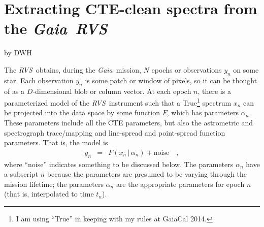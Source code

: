 \documentclass[11pt]{article}
\newcommand{\given}{\,|\,}
\newcommand{\instrument}[1]{\textsl{#1}}
\newcommand{\Gaia}{\instrument{Gaia}}
\newcommand{\RVS}{\instrument{RVS}}
\begin{document}
\section*{Extracting CTE-clean spectra from the \Gaia\ \RVS}
\noindent
by DWH

\begin{abstract}

The \Gaia~\RVS\ data will suffer from observable distortions (CTE)
caused by radiation damage and the charge traps that are caused
thereby.
The \RVS\ team is creating empirical models of the time-dependent
distortions.
These models are computationally feasible to ``run forward''; indeed
parameter estimation (radial velocities, temperatures, and so on)
based on the \RVS\ will be based on a forward model of the data,
including the CTE.
Here we show that it is possible to extract CTE-undistorted spectra
from either single epochs or else multiple epochs of \RVS\ data using
one of these CTE models.
There is no need to ``undistort'' or ``correct'' the data.
Inasmuch as these extracted spectra and their uncertainty tensors will
be close to sufficient statistics for the raw data, they could be used
for stellar parameter estimation.
\end{abstract}

The \RVS\ obtains, during the \Gaia\ mission, $N$ epochs or
observations $y_n$ on some star.
Each observation $y_n$ is some patch or window of pixels, so it can be
thought of as a $D$-dimensional blob or column vector.
At each epoch $n$, there is a parameterized model of the
\RVS\ instrument such that a True\footnote{I am using ``True'' in
  keeping with my rules at GaiaCal 2014.} spectrum $x_n$ can be
projected into the data space by some function $F$, which has
parameters $\alpha_n$.
These parameters include all the CTE parameters, but also the
astrometric and spectrograph trace/mapping and line-spread and
point-spread function parameters.
That is, the model is
\begin{eqnarray}
y_n &=& F(x_n\given \alpha_n) + \mbox{noise}
\quad,
\end{eqnarray}
where ``noise'' indicates something to be discussed below.
The parameters $\alpha_n$ have a subscript $n$ because the parameters
are presumed to be varying through the mission lifetime; the
parameters $\alpha_n$ are the appropriate parameters for epoch $n$
(that is, interpolated to time $t_n$).
\end{document}

